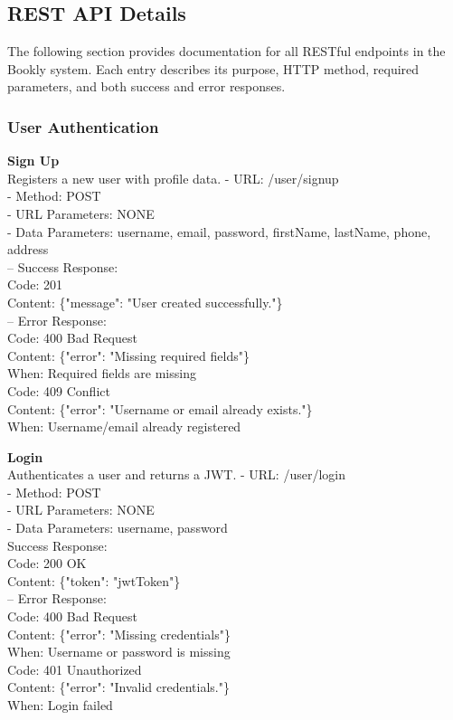 \subsection*{REST API Details}

The following section provides documentation for all RESTful endpoints in the Bookly system. Each entry describes its purpose, HTTP method, required parameters, and both success and error responses.

\subsubsection*{User Authentication}

\textbf{Sign Up} \\
Registers a new user with profile data.
- URL: /user/signup \\
- Method: POST \\
- URL Parameters: NONE \\
- Data Parameters: username, email, password, firstName, lastName, phone, address \\
– Success Response: \\
Code: 201 \\
Content: \{"message": "User created successfully."\} \\
– Error Response: \\
Code: 400 Bad Request \\
Content: \{"error": "Missing required fields"\} \\
When: Required fields are missing \\
Code: 409 Conflict \\
Content: \{"error": "Username or email already exists."\} \\
When: Username/email already registered

\textbf{Login} \\
Authenticates a user and returns a JWT.
- URL: /user/login \\
- Method: POST \\
- URL Parameters: NONE \\
- Data Parameters: username, password \\
Success Response: \\
Code: 200 OK \\
Content: \{"token": "jwtToken"\} \\
– Error Response: \\
Code: 400 Bad Request \\
Content: \{"error": "Missing credentials"\} \\
When: Username or password is missing \\
Code: 401 Unauthorized \\
Content: \{"error": "Invalid credentials."\} \\
When: Login failed

